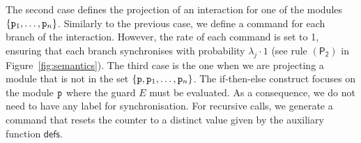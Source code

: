     The second case defines the projection of an interaction for one
    of the modules \( \{\mathtt{p}_1, \ldots, \mathtt{p}_n\} \). Similarly
    to the previous case, we define a command for each branch of the
    interaction. However, the rate of each command is set to 1,
    ensuring that each branch synchronises with probability
    \( \lambda_j \cdot 1 \) (see rule \( \mathsf{(P_2)} \) in
    Figure~\ref{fig:semantics}).
    The third case is the one when we are projecting a module that is
    not in the set $\{\mathtt{p}, \mathtt{p}_1,\ldots,\mathtt{p}_n\}$. %
    The if-then-else construct focuses on the module $\mathtt{p}$ where
    the guard $E$ must be evaluated. As a consequence, we do not need
    to have any label for synchronisation. 
    For recursive calls, we generate a command that resets the counter
    to a distinct value given by the auxiliary function
    $\textsf{defs}$. 

